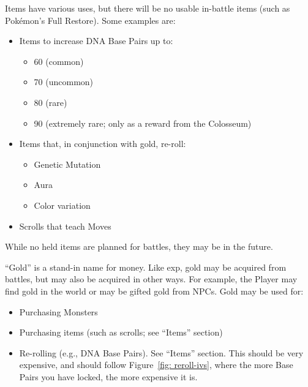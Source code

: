 Items have various uses, but there will be no usable in-battle items (such as Pok\'{e}mon's Full Restore). Some examples are:

\begin{itemize}
	\item{Items to increase DNA Base Pairs up to:
		\begin{itemize}
			\item{60 (common)}
			\item{70 (uncommon)}
			\item{80 (rare)}
			\item{90 (extremely rare; only as a reward from the Colosseum)}
		\end{itemize}
	}
	\item{Items that, in conjunction with gold, re-roll:
		\begin{itemize}
			\item{Genetic Mutation}
			\item{Aura}
			\item{Color variation}
		\end{itemize}
	}
	\item{Scrolls that teach Moves}
\end{itemize}
While no held items are planned for battles, they may be in the future.

``Gold'' is a stand-in name for money. Like exp, gold may be acquired from battles, but may also be acquired in other ways. For example, the Player may find gold in the world or may be gifted gold from NPCs. Gold may be used for:
\begin{itemize}
	\item{Purchasing Monsters}
	\item{Purchasing items (such as scrolls; see ``Items'' section)}
	\item{Re-rolling (e.g., DNA Base Pairs). See ``Items'' section. This should be very expensive, and should follow Figure~\ref{fig: reroll-ivs}, where the more Base Pairs you have locked, the more expensive it is.}
\end{itemize}


